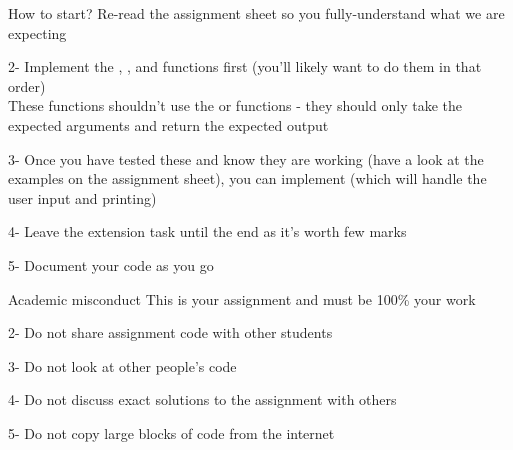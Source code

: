 \documentclass[week3]{csse1001}
\begin{document}
\begin{topic}{How to start?}
Re-read the assignment sheet so you fully-understand what we are expecting
\begin{subtopic}{2-}
Implement the , , and  functions first (you'll likely want to do them in that order)\\
These functions shouldn't use the  or  functions - they should only take the expected arguments and return the expected output
\end{subtopic}
\begin{subtopic}{3-}
Once you have tested these and know they are working (have a look at the examples on the assignment sheet), you can implement  (which will handle the user input and printing)
\end{subtopic}
\begin{subtopic}{4-}
Leave the extension task until the end as it's worth few marks
\end{subtopic}
\begin{subtopic}{5-}
Document your code as you go
\end{subtopic}
\end{topic}

\begin{topic}{Academic misconduct}
This is your assignment and must be 100\% your work
\begin{subtopic}{2-}
Do not share assignment code with other students
\end{subtopic}
\begin{subtopic}{3-}
Do not look at other people's code
\end{subtopic}
\begin{subtopic}{4-}
Do not discuss exact solutions to the assignment with others
\end{subtopic}
\begin{subtopic}{5-}
Do not copy large blocks of code from the internet
\end{subtopic}
\end{topic}
\end{document}
